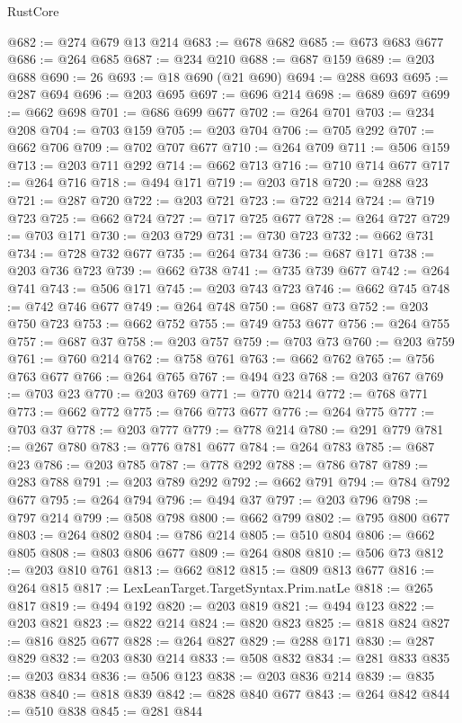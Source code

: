 \begin{lexlean}{RustCore}
\begin{coremodule}
@682 := @274 @679 @13 @214
@683 := @678 @682
@685 := @673 @683 @677
@686 := @264 @685
@687 := @234 @210
@688 := @687 @159
@689 := @203 @688
@690 := 26
@693 := @18 @690 (@21 @690)
@694 := @288 @693
@695 := @287 @694
@696 := @203 @695
@697 := @696 @214
@698 := @689 @697
@699 := @662 @698
@701 := @686 @699 @677
@702 := @264 @701
@703 := @234 @208
@704 := @703 @159
@705 := @203 @704
@706 := @705 @292
@707 := @662 @706
@709 := @702 @707 @677
@710 := @264 @709
@711 := @506 @159
@713 := @203 @711 @292
@714 := @662 @713
@716 := @710 @714 @677
@717 := @264 @716
@718 := @494 @171
@719 := @203 @718
@720 := @288 @23
@721 := @287 @720
@722 := @203 @721
@723 := @722 @214
@724 := @719 @723
@725 := @662 @724
@727 := @717 @725 @677
@728 := @264 @727
@729 := @703 @171
@730 := @203 @729
@731 := @730 @723
@732 := @662 @731
@734 := @728 @732 @677
@735 := @264 @734
@736 := @687 @171
@738 := @203 @736 @723
@739 := @662 @738
@741 := @735 @739 @677
@742 := @264 @741
@743 := @506 @171
@745 := @203 @743 @723
@746 := @662 @745
@748 := @742 @746 @677
@749 := @264 @748
@750 := @687 @73
@752 := @203 @750 @723
@753 := @662 @752
@755 := @749 @753 @677
@756 := @264 @755
@757 := @687 @37
@758 := @203 @757
@759 := @703 @73
@760 := @203 @759
@761 := @760 @214
@762 := @758 @761
@763 := @662 @762
@765 := @756 @763 @677
@766 := @264 @765
@767 := @494 @23
@768 := @203 @767
@769 := @703 @23
@770 := @203 @769
@771 := @770 @214
@772 := @768 @771
@773 := @662 @772
@775 := @766 @773 @677
@776 := @264 @775
@777 := @703 @37
@778 := @203 @777
@779 := @778 @214
@780 := @291 @779
@781 := @267 @780
@783 := @776 @781 @677
@784 := @264 @783
@785 := @687 @23
@786 := @203 @785
@787 := @778 @292
@788 := @786 @787
@789 := @283 @788
@791 := @203 @789 @292
@792 := @662 @791
@794 := @784 @792 @677
@795 := @264 @794
@796 := @494 @37
@797 := @203 @796
@798 := @797 @214
@799 := @508 @798
@800 := @662 @799
@802 := @795 @800 @677
@803 := @264 @802
@804 := @786 @214
@805 := @510 @804
@806 := @662 @805
@808 := @803 @806 @677
@809 := @264 @808
@810 := @506 @73
@812 := @203 @810 @761
@813 := @662 @812
@815 := @809 @813 @677
@816 := @264 @815
@817 := LexLeanTarget.TargetSyntax.Prim.natLe
@818 := @265 @817
@819 := @494 @192
@820 := @203 @819
@821 := @494 @123
@822 := @203 @821
@823 := @822 @214
@824 := @820 @823
@825 := @818 @824
@827 := @816 @825 @677
@828 := @264 @827
@829 := @288 @171
@830 := @287 @829
@832 := @203 @830 @214
@833 := @508 @832
@834 := @281 @833
@835 := @203 @834
@836 := @506 @123
@838 := @203 @836 @214
@839 := @835 @838
@840 := @818 @839
@842 := @828 @840 @677
@843 := @264 @842
@844 := @510 @838
@845 := @281 @844

\end{coremodule}
\end{lexlean}

